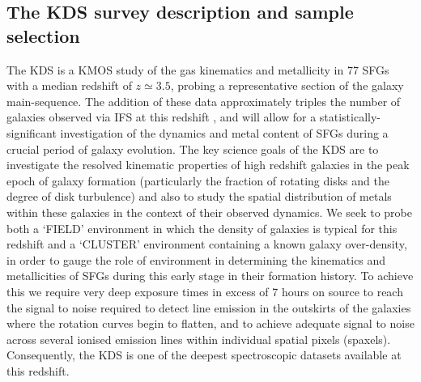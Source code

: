 \documentclass[fleqn,usenatbib]{mnras}
\begin{document}
\subsection{The KDS survey description and sample selection}\label{subsec:survey_intro}
The KDS is a KMOS study of the gas kinematics and metallicity in 77 SFGs with a median redshift of $z\simeq3.5$, probing a representative section of the galaxy main-sequence.
The addition of these data approximately triples the number of galaxies observed via IFS at this redshift \citep{Cresci2010,Lemoine-Busserolle2010,Gnerucci2011}, and will allow for a statistically-significant investigation of the dynamics and metal content of SFGs during a crucial period of galaxy evolution. 
The key science goals of the KDS are to investigate the resolved kinematic properties of high redshift galaxies in the peak epoch of galaxy formation (particularly the fraction of rotating disks and the degree of disk turbulence) and also to study the spatial distribution of metals within these galaxies in the context of their observed dynamics.
We seek to probe both a `FIELD' environment in which the density of galaxies is typical for this redshift and a `CLUSTER' environment containing a known galaxy over-density, in order to gauge the role of environment in determining the kinematics and metallicities of SFGs during this early stage in their formation history.
To achieve this we require very deep exposure times in excess of 7 hours on source to reach the signal to noise required to detect line emission in the outskirts of the galaxies where the rotation curves begin to flatten, and to achieve adequate signal to noise across several ionised emission lines within individual spatial pixels (spaxels).
Consequently, the KDS is one of the deepest spectroscopic datasets available at this redshift. 
\end{document}
